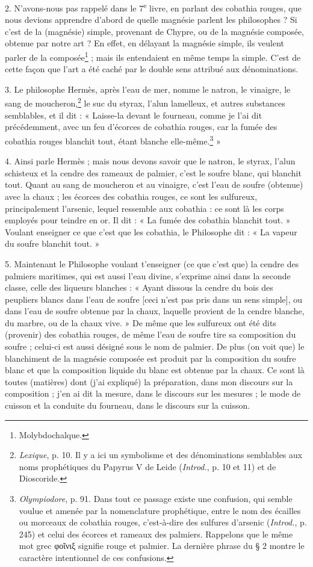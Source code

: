 \documentclass[a4paper, 11pt, oneside, polutonikogreek, french]{article}
\begin{document}
2. N'avons-nous pas rappelé dans le 7\textsuperscript{e} livre, en parlant des cobathia rouges, que nous devions apprendre d'abord de quelle magnésie parlent les philosophes ? Si c'est de la (magnésie) simple, provenant de Chypre, ou de la magnésie composée, obtenue par notre art ? En effet, en délayant la magnésie simple, ils veulent parler de la composée\footnote{Molybdochalque.} ; mais ils entendaient en même temps la simple. C'est de cette façon que l'art a été caché par le double sens attribué aux dénominations.

3. Le philosophe Hermès, après l'eau de mer, nomme le natron, le vinaigre, le sang de moucheron,\footnote{\emph{Lexique}, p. 10. Il y a ici un symbolisme et des dénominations semblables aux noms prophétiques du Papyrus V de Leide (\emph{Introd.}, p. 10 et 11) et de Dioscoride.} le suc du styrax, l'alun lamelleux, et autres substances semblables, et il dit : « Laisse-la devant le fourneau, comme je l'ai dit précédemment, avec un feu d'écorces de cobathia rouges, car la fumée des cobathia rouges blanchit tout, étant blanche elle-même.\footnote{\emph{Olympiodore}, p. 91. Dans tout ce passage existe une confusion, qui semble voulue et amenée par la nomenclature prophétique, entre le nom des écailles ou morceaux de cobathia rouges, c'est-à-dire des sulfures d'arsenic (\emph{Introd.}, p. 245) et celui des écorces et rameaux des palmiers. Rappelons que le même mot grec φοῖνιξ signifie rouge et palmier. La dernière phrase du § 2 montre le caractère intentionnel de ces confusions.} »

4. Ainsi parle Hermès ; mais nous devons savoir que le natron, le styrax, l'alun schisteux et la cendre des rameaux de palmier, c'est le soufre blanc, qui blanchit tout. Quant au sang de moucheron et au vinaigre, c'est l'eau de soufre (obtenue) avec la chaux ; les écorces des cobathia rouges, ce sont les sulfureux, principalement l'arsenic, lequel ressemble aux cobathia : ce sont là les corps employés pour teindre en or. Il dit : « La fumée des cobathia blanchit tout. » Voulant enseigner ce que c'est que les cobathia, le Philosophe dit : « La vapeur du soufre blanchit tout. »

5. Maintenant le Philosophe voulant t'enseigner (ce que c'est que) la cendre des palmiers maritimes, qui est aussi l'eau divine, s'exprime ainsi dans la seconde classe, celle des liqueurs blanches : « Ayant dissous la cendre du bois des peupliers blancs dans l'eau de soufre [ceci n'est pas pris dans un sens simple], ou dans l'eau de soufre obtenue par la chaux, laquelle provient de la cendre blanche, du marbre, ou de la chaux vive. » De même que les sulfureux ont été dits (provenir) des cobathia rouges, de même l'eau de soufre tire sa composition du soufre ; celui-ci est aussi désigné sous le nom de palmier. De plus (on voit que) le blanchiment de la magnésie composée est produit par la composition du soufre blanc et que la composition liquide du blanc est obtenue par la chaux. Ce sont là toutes (matières) dont (j'ai expliqué) la préparation, dans mon discours sur la composition ; j'en ai dit la mesure, dans le discours sur les mesures ; le mode de cuisson et la conduite du fourneau, dans le discours sur la cuisson.
\end{document}
